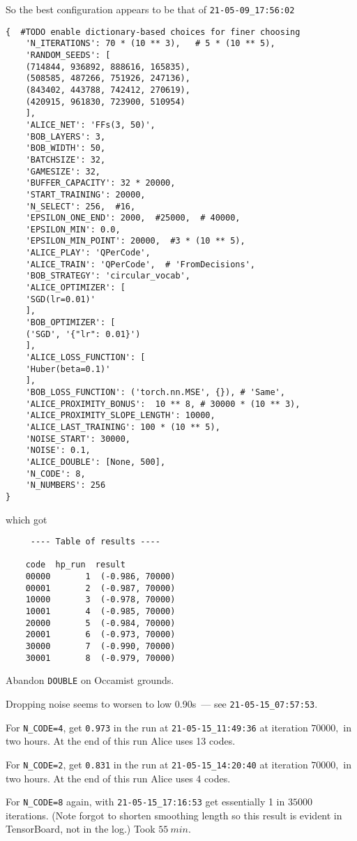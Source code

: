 \documentclass[12pt]{article}
\begin{document}
So the best configuration appears to be that of \verb|21-05-09_17:56:02|
\begin{lstlisting}
{  #TODO enable dictionary-based choices for finer choosing
	'N_ITERATIONS': 70 * (10 ** 3),   # 5 * (10 ** 5),
	'RANDOM_SEEDS': [
	(714844, 936892, 888616, 165835),
	(508585, 487266, 751926, 247136),
	(843402, 443788, 742412, 270619),
	(420915, 961830, 723900, 510954)
	],
	'ALICE_NET': 'FFs(3, 50)',
	'BOB_LAYERS': 3,
	'BOB_WIDTH': 50,
	'BATCHSIZE': 32,
	'GAMESIZE': 32,
	'BUFFER_CAPACITY': 32 * 20000,
	'START_TRAINING': 20000,
	'N_SELECT': 256,  #16,
	'EPSILON_ONE_END': 2000,  #25000,  # 40000,
	'EPSILON_MIN': 0.0,
	'EPSILON_MIN_POINT': 20000,  #3 * (10 ** 5),
	'ALICE_PLAY': 'QPerCode',
	'ALICE_TRAIN': 'QPerCode',  # 'FromDecisions',
	'BOB_STRATEGY': 'circular_vocab',
	'ALICE_OPTIMIZER': [
	'SGD(lr=0.01)'
	],
	'BOB_OPTIMIZER': [
	('SGD', '{"lr": 0.01}')
	],
	'ALICE_LOSS_FUNCTION': [
	'Huber(beta=0.1)'
	],
	'BOB_LOSS_FUNCTION': ('torch.nn.MSE', {}), # 'Same',
	'ALICE_PROXIMITY_BONUS':  10 ** 8, # 30000 * (10 ** 3),
	'ALICE_PROXIMITY_SLOPE_LENGTH': 10000,
	'ALICE_LAST_TRAINING': 100 * (10 ** 5),
	'NOISE_START': 30000,
	'NOISE': 0.1,
	'ALICE_DOUBLE': [None, 500],
	'N_CODE': 8,
	'N_NUMBERS': 256
}
\end{lstlisting}
which got
\begin{lstlisting}
	 ---- Table of results ----
	
	code  hp_run  result
	00000       1  (-0.986, 70000)
	00001       2  (-0.987, 70000)
	10000       3  (-0.978, 70000)
	10001       4  (-0.985, 70000)
	20000       5  (-0.984, 70000)
	20001       6  (-0.973, 70000)
	30000       7  (-0.990, 70000)
	30001       8  (-0.979, 70000)
\end{lstlisting}
Abandon \verb|DOUBLE| on Occamist grounds.

Dropping noise seems to worsen to low 0.90s~--- see \verb|21-05-15_07:57:53|.

For \verb|N_CODE=4|, get \verb|0.973| in the run at \verb|21-05-15_11:49:36| at iteration $\num{70000},$ in two hours.  At the end of this run Alice uses 13 codes.

For \verb|N_CODE=2|, get \verb|0.831| in the run at \verb|21-05-15_14:20:40| at iteration $\num{70000},$ in two hours.  At the end of this run Alice uses 4 codes.

For \verb|N_CODE=8| again, with \verb|21-05-15_17:16:53| get essentially 1 in $\num{35000}$ iterations.  (Note forgot to shorten smoothing length so this result is evident in TensorBoard, not in the log.)  Took $\SI{55}{min}.$
\end{document}

